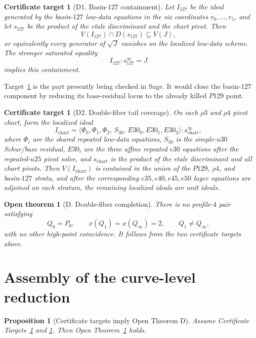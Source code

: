 \documentclass[11pt]{amsart}
\newtheorem{proposition}[theorem]{Proposition}
\newtheorem{opentheorem}[theorem]{Open theorem}
\newtheorem{target}[theorem]{Certificate target}
\begin{document}
\begin{target}[D1. Basin-\(127\) containment]
\label{target:basin127}
Let \(I_{127}\) be the ideal generated by the basin-\(127\) low-data equations
in the six coordinates \(r_0,\ldots,r_5\), and let \(s_{127}\) be the product
of the etale discriminant and the chart pivot.  Then
\[
  V(I_{127})\cap D(s_{127})\subseteq V(J),
\]
or equivalently every generator of \(\sqrt{J}\) vanishes on the localized
low-data scheme.  The stronger saturated equality
\[
  I_{127}:s_{127}^{\infty}=J
\]
implies this containment.
\end{target}

Target~\ref{target:basin127} is the part presently being checked in Sage.  It
would close the basin-\(127\) component by reducing its base-residual locus to
the already killed \(P129\) point.

\begin{target}[D2. Double-fiber tail coverage]
\label{target:tail-coverage}
On each \(\rho3\) and \(\rho4\) pivot chart, form the localized ideal
\[
  I_{\mathrm{chart}}
  =
  \langle
  \Phi_0,\Phi_1,\Phi_2,\,
  S_{30},\,
  E30_0,E30_1,E30_2
  \rangle:s_{\mathrm{chart}}^\infty,
\]
where \(\Phi_i\) are the shared repeated low-data equations, \(S_{30}\) is the
simple-\(u30\) Schur/base residual, \(E30_i\) are the three affine repeated
\(e30\) equations after the repeated-\(u25\) pivot solve, and
\(s_{\mathrm{chart}}\) is the product of the etale discriminant and all chart
pivots.  Then \(V(I_{\mathrm{chart}})\) is contained in the union of
the \(P129\), \(\rho4\), and basin-\(127\) strata, and after the
corresponding \(e35,e40,e45,e50\) layer equations are adjoined on each stratum,
the remaining localized ideals are unit ideals.
\end{target}

\begin{opentheorem}[D. Double-fiber completion]
\label{open:double-fiber}
There is no profile-\(4\) pair satisfying
\[
  Q_0=P_0,\qquad
  x(Q_1)=x(Q_\infty)=2,\qquad
  Q_1\ne Q_\infty,
\]
with no other high-point coincidence.  It follows from the two certificate
targets above.
\end{opentheorem}

\section{Assembly of the curve-level reduction}
\label{sec:assembly}

\begin{proposition}[Certificate targets imply Open Theorem D]
\label{prop:entry0-conditional}
Assume Certificate Targets~\ref{target:basin127} and
\ref{target:tail-coverage}.  Then Open Theorem~\ref{open:double-fiber}
holds.
\end{proposition}
\end{document}
